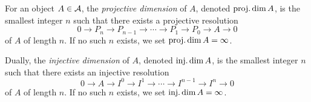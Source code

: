     \begin{definition}
        For an object \(A \in {\mathcal{A}}\), the \emph{projective dimension} of \(A\), denoted \(\operatorname{proj.dim} A\), 
        is the smallest integer \(n\) such that there exists a projective resolution
        \[ 0 \to P_n \to P_{n-1} \to \cdots \to P_1 \to P_0 \to A \to 0\] 
        of \(A\) of length \(n\).
        If no such \(n\) exists, we set \(\operatorname{proj.dim} A = \infty\).
        
        Dually, the \emph{injective dimension} of \(A\), denoted \(\operatorname{inj.dim} A\), 
        is the smallest integer \(n\) such that there exists an injective resolution 
        \[ 0 \to A \to I^0 \to I^1 \to \cdots \to I^{n-1} \to I^n \to 0\]
        of \(A\) of length \(n\).
        If no such \(n\) exists, we set \(\operatorname{inj.dim} A = \infty\).
    \end{definition}

    

